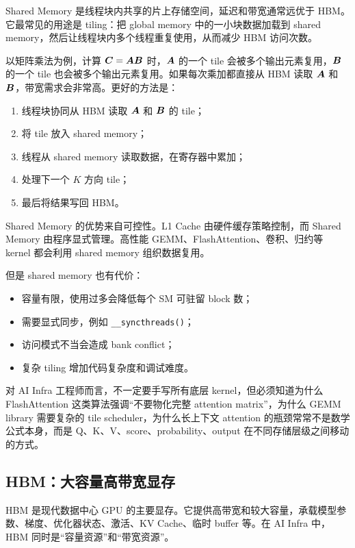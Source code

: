 Shared Memory 是线程块内共享的片上存储空间，延迟和带宽通常远优于 HBM。它最常见的用途是 tiling：把 global memory 中的一小块数据加载到 shared memory，然后让线程块内多个线程重复使用，从而减少 HBM 访问次数。

以矩阵乘法为例，计算 $\bm{C} = \bm{A}\bm{B}$ 时，$\bm{A}$ 的一个 tile 会被多个输出元素复用，$\bm{B}$ 的一个 tile 也会被多个输出元素复用。如果每次乘加都直接从 HBM 读取 $\bm{A}$ 和 $\bm{B}$，带宽需求会非常高。更好的方法是：

\begin{enumerate}
  \item 线程块协同从 HBM 读取 $\bm{A}$ 和 $\bm{B}$ 的 tile；
  \item 将 tile 放入 shared memory；
  \item 线程从 shared memory 读取数据，在寄存器中累加；
  \item 处理下一个 $K$ 方向 tile；
  \item 最后将结果写回 HBM。
\end{enumerate}

Shared Memory 的优势来自可控性。L1 Cache 由硬件缓存策略控制，而 Shared Memory 由程序显式管理。高性能 GEMM、FlashAttention、卷积、归约等 kernel 都会利用 shared memory 组织数据复用。

但是 shared memory 也有代价：

\begin{itemize}
  \item 容量有限，使用过多会降低每个 SM 可驻留 block 数；
  \item 需要显式同步，例如 \texttt{\_\_syncthreads()}；
  \item 访问模式不当会造成 bank conflict；
  \item 复杂 tiling 增加代码复杂度和调试难度。
\end{itemize}

对 AI Infra 工程师而言，不一定要手写所有底层 kernel，但必须知道为什么 FlashAttention 这类算法强调“不要物化完整 attention matrix”，为什么 GEMM library 需要复杂的 tile scheduler，为什么长上下文 attention 的瓶颈常常不是数学公式本身，而是 Q、K、V、score、probability、output 在不同存储层级之间移动的方式。

\subsection{HBM：大容量高带宽显存}
\label{subsec:hbm}

HBM 是现代数据中心 GPU 的主要显存。它提供高带宽和较大容量，承载模型参数、梯度、优化器状态、激活、KV Cache、临时 buffer 等。在 AI Infra 中，HBM 同时是“容量资源”和“带宽资源”。

